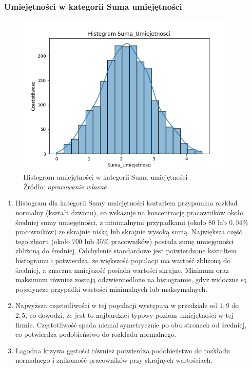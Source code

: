         \subsubsection{Umiejętności w kategorii Suma umiejętności}
        \begin{figure}[H]
            \centering
            \includegraphics[width=\linewidth]{chapters/Images/hist_suma.png}
            \cprotect\caption{Histogram umiejętności w kategorii Suma umiejętności\\ Źródło:\textit{ opracowanie własne}}
            \label{fig:hist_suma}
        \end{figure}

        \begin{enumerate}
            \item Histogram dla kategorii Sumy umiejętności kształtem przypomina rozkład normalny (kształt dzwonu), co wskazuje na koncentrację pracowników około średniej sumy umiejętności, z minimalnymi przypadkami (około $80$ lub $0,04\%$ pracowników) ze skrajnie niską lub skrajnie wysoką sumą. Największa część tego zbioru (około $700$ lub $35\%$ pracowników) posiada sumę umiejętności zbliżoną do średniej. Odchylenie standardowe jest potwierdzone kształtem histogramu i potwierdza, że większość populacji ma wartość zbliżoną do średniej, a znaczna mniejszość posiada wartości skrajne. Minimum oraz maksimum również zostają odzwierciedlone na histogramie, gdyż widoczne są pojedyncze przypadki wartości minimalnych lub maksymalnych.
            \item Najwyższa częstotliwości w tej populacji występują w przedziale od $1,9$ do $2,5$, co dowodzi, że jest to najbardziej typowy poziom umiejętności w tej firmie. Częstotliwość spada niemal symetrycznie po obu stronach od średniej, co potwierdza podobieństwo do rozkładu normalnego.
            \item Łagodna krzywa gęstości również potwierdza podobieństwo do rozkładu normalnego i znikomość pracowników przy skrajnych wartościach. 
        \end{enumerate}

